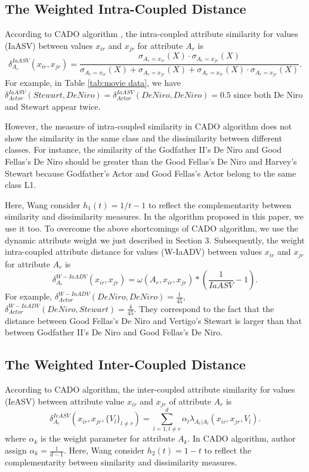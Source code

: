 \documentclass[review]{elsarticle}
\begin{document}
\subsection{The Weighted Intra-Coupled Distance}
According to CADO algorithm \cite{WangC2015CADO}, the intra-coupled attribute similarity for values (IaASV) between values $x_{ir}$ and $x_{jr}$ for attribute $A_r$ is
\begin{equation}
\delta_{A_r}^{IaASV}(x_{ir},x_{jr}) = \frac{\sigma_{A_r = x_{ir}}(X) \cdot \sigma_{A_r = x_{jr}}(X)}{\sigma_{A_r = x_{ir}}(X) + \sigma_{A_r = x_{jr}}(X) + \sigma_{A_r = x_{ir}}(X) \cdot \sigma_{A_r = x_{jr}}(X)}.
\label{equ17}
\end{equation}
For example, in Table \ref{tab:movie data}, we have $\delta_{Actor}^{IaASV}(Stewart,De Niro) = \delta_{Actor}^{IaASV}(De Niro,De Niro) = 0.5$ since both De Niro and Stewart appear twice.

However, the measure of intra-coupled similarity in CADO algorithm does not show the similarity in the same class and the dissimilarity between different classes. For instance, the similarity of the Godfather II's De Niro and Good Fellas's De Niro should be greater than the Good Fellas's De Niro and Harvey's Stewart because Godfather's Actor and Good Fellas's Actor belong to the same class L1.

Here, Wang consider $h_1(t) = 1/t - 1$ to reflect the complementarity between similarity and dissimilarity measures. In the algorithm proposed in this paper, we use it too. To overcome the above shortcomings of CADO algorithm, we use the dynamic attribute weight we just described in Section 3. Subsequently, the weight intra-coupled attribute distance for values (W-IaADV) between values $x_{ir}$ and $x_{jr}$ for attribute $A_r$ is
\begin{equation}
\label{equ18}
\delta_{A_r}^{W-IaADV}(x_{ir},x_{jr}) = \omega(A_r,x_{ir},x_{jr}) * (\frac{1}{IaASV} - 1).
\end{equation}
For example, $\delta_{Actor}^{W-IaADV}(De Niro,De Niro) = \frac{1}{45}$, $\delta_{Actor}^{W-IaADV}(De Niro,Stewart) = \frac{4}{45}$. They correspond to the fact that the distance between Good Fellas's De Niro and Vertigo's Stewart is larger than that between Godfather II's De Niro and Good Fellas's De Niro.

\subsection{The Weighted Inter-Coupled Distance}
According to CADO algorithm, the inter-coupled attribute similarity for values (IeASV) between attribute value $x_{ir}$ and $x_{jr}$ of attribute $A_r$ is
\begin{equation}
\delta_{A_r}^{IeASV}(x_{ir},x_{jr},\{V_l\}_{l \neq r}) = \sum_{l=1,l \neq r}^{d} \alpha_l \lambda_{A_r|A_l}(x_{ir},x_{jr},V_l).
\label{equ19}
\end{equation}
where $\alpha_k$ is the weight parameter for attribute $A_k$. In CADO algorithm, author assign $\alpha_k = \frac{1}{d-1}$. Here, Wang consider $h_2(t) = 1 - t$ to reflect the complementarity between similarity and dissimilarity measures.
\end{document}
